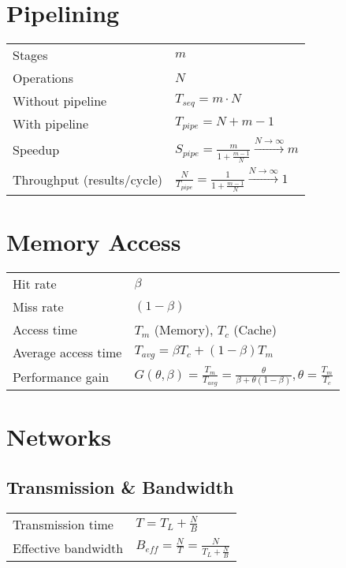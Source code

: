\documentclass[11pt]{article}
\begin{document}
\section{Pipelining}

\begin{tabular}{ p{7cm} l }
	Stages & $m$ \\
	Operations & $N$ \\
	Without pipeline & \( T_{seq} = m \cdot N \) \\
	With pipeline & \( T_{pipe} = N + m - 1 \) \\
	Speedup & \(S_{pipe} = \frac{m}{1 + \frac{m-1}{N}} \xrightarrow{N \rightarrow \infty} m \) \\
	Throughput (results/cycle) & \( \frac{N}{T_{pipe}} = \frac{1}{1 + \frac{m-1}{N}} \xrightarrow{N \rightarrow \infty} 1 \) \\
\end{tabular}

\section{Memory Access}

\begin{tabular}{ p{7cm} l }
	Hit rate & $\beta$ \\
	Miss rate & $(1 - \beta)$ \\
	Access time& $T_m$ (Memory), $T_c$ (Cache) \\
	Average access time & \( T_{avg} = \beta T_c + (1 - \beta) T_m \) \\
	Performance gain & \( G( \theta, \beta ) = \frac{T_m}{T_{avg}} = \frac{\theta}{\beta + \theta(1 - \beta)},  \theta = \frac{T_m}{T_c} \) \\
\end{tabular}

\section{Networks}

\subsection{Transmission \& Bandwidth}

\begin{tabular}{ p{7cm} l }
	Transmission time & \( T = T_L + \frac{N}{B} \) \\
	Effective bandwidth & \( B_{eff} = \frac{N}{T} = \frac{N}{T_L + \frac{N}{B}} \) \\
\end{tabular}
\end{document}
